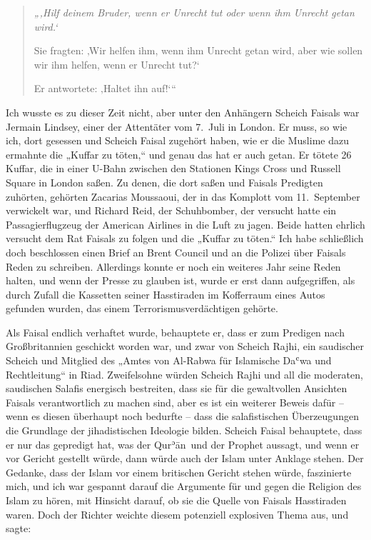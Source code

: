 \documentclass[12pt]{memoir}
\def\´{ʾ} %
\def\`{ʿ} %
\def \Quran{Qur\-\´ān} %
\def\–{\hskip0pt-\hskip0pt}
\begin{document}
\begin{quote}
\itshape
„‚Hilf deinem Bruder, wenn er Unrecht tut oder wenn ihm Unrecht getan wird.‘

Sie fragten: ‚Wir helfen ihm, wenn ihm Unrecht getan wird,
aber wie sollen wir ihm helfen, wenn er Unrecht tut?‘

Er antwortete: ‚Haltet ihn auf!‘“
\end{quote}

Ich wusste es zu dieser Zeit nicht,
aber unter den Anhängern Scheich Faisals war Jermain Lindsey,
einer der Attentäter vom 7.\ Juli in London.
Er muss, so wie ich, dort gesessen
und Scheich Faisal zugehört haben,
wie er die Muslime dazu ermahnte die „Kuffar zu töten,“
und genau das hat er auch getan.
Er tötete 26 Kuffar, die in einer U-Bahn zwischen den Stationen
Kings Cross und Russell Square in London saßen.
Zu denen, die dort saßen und Faisals Predigten zuhörten,
gehörten Zacarias Moussaoui,
der in das Komplott vom 11.\ September verwickelt war,
und Richard Reid, der Schuhbomber,
der versucht hatte ein Passagierflugzeug der American Airlines
in die Luft zu jagen.
Beide hatten ehrlich versucht dem Rat Faisals zu folgen
und die „Kuffar zu töten.“
Ich habe schließlich doch beschlossen einen Brief
an Brent Council und an die Polizei über Faisals Reden zu schreiben.
Allerdings konnte er noch ein weiteres Jahr seine Reden halten,
und wenn der Presse zu glauben ist,
wurde er erst dann aufgegriffen,
als durch Zufall die Kassetten seiner Hasstiraden
im Kofferraum eines Autos gefunden wurden,
das einem Terrorismusverdächtigen gehörte.

Als Faisal endlich verhaftet wurde, behauptete er,
dass er zum Predigen nach Großbritannien geschickt worden war,
und zwar von Scheich Rajhi,
ein saudischer Scheich und Mitglied des „Amtes von Al\–Rabwa
für Islamische Da\`wa und Rechtleitung“ in Riad.
Zweifelsohne würden Scheich Rajhi und all
die moderaten, saudischen Salafis energisch bestreiten,
dass sie für die gewaltvollen Ansichten Faisals verantwortlich zu machen sind,
aber es ist ein weiterer Beweis dafür –
wenn es diesen überhaupt noch bedurfte –
dass die salafistischen Überzeugungen
die Grundlage der jihadistischen Ideologie bilden.
Scheich Faisal behauptete, dass er nur das gepredigt hat,
was der \Quran\ und der Prophet aussagt,
und wenn er vor Gericht gestellt würde,
dann würde auch der Islam unter Anklage stehen.
Der Gedanke, dass der Islam vor einem britischen Gericht stehen würde,
faszinierte mich, und ich war gespannt darauf die Argumente
für und gegen die Religion des Islam zu hören,
mit Hinsicht darauf, ob sie die Quelle von Faisals Hasstiraden waren.
Doch der Richter weichte diesem potenziell explosiven Thema aus,
und sagte:
\end{document}
